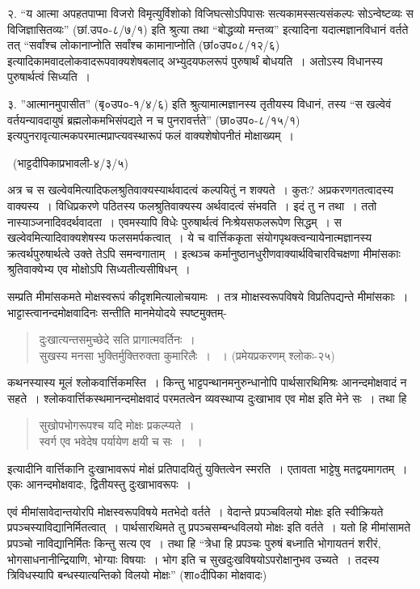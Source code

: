 {२. “य आत्मा अपहतपाप्मा विजरो विमृत्युर्विशोको विजिघत्सोऽपिपासः सत्यकामस्सत्यसंकल्पः सोऽन्वेष्टव्यः स विजिज्ञासितव्यः” (छां.उप०-८/७/१) इति श्रुत्या तथा “बोद्धव्यो मन्तव्य” इत्यादिना यदात्मज्ञानविधानं वर्तते तत् “सर्वांश्च लोकानाप्नोति सर्वांश्च कामानाप्नोति (छां०उप०८/१२/६) इत्यादिकामवादलोकवादरूपवाक्यशेषबलाद् अभ्युदयफलरूपं पुरुषार्थं बोधयति~। अतोऽस्य विधानस्य पुरुषार्थत्वं सिध्यति~। 

३. ”आत्मानमुपासीत” (बृ०उप०-१/४/६) इति श्रुत्यामात्मज्ञानस्य तृतीयस्य विधानं, तस्य “स खल्वेवं वर्तयन्यावदायुषं ब्रह्मलोकमभिसंपद्यते न च पुनरावर्त्तते” (छा०उप०-८/१५/१) इत्यपुनरावृत्यात्मकपरमात्मप्राप्त्यवस्थारूपं फलं वाक्यशेषोपनीतं मोक्षाख्यम्~। 

~\hfill (भाट्टदीपिकाप्रभावली-४/३/५) 

अत्र च स खल्वेवमित्यादिफलश्रुतिवाक्यस्यार्थवादत्वं कल्पयितुं न शक्यते~। कुतः? अप्रकरणगतत्वादस्य वाक्यस्य~। विधिप्रकरणे पठितस्य फलश्रुतिवाक्यस्य अर्थवादत्वं संभवति~। इदं तु न तथा~। ततो नास्याञ्जनादिवदर्थवादता~। एवमस्यापि विधेः पुरुषार्थत्वं निःश्रेयसफलरूपेण सिद्धम्~। स खल्वेवमित्यादिवाक्यशेषस्य फलसमर्पकत्वात्~। ये च वार्त्तिककृता संयोगपृथक्त्वन्यायेनात्मज्ञानस्य क्रत्वर्थपुरुषार्थत्वे उक्ते तेऽपि समन्वगाताम्~। इत्थञ्च कर्मानुष्ठानधुरीणवाक्यार्थविचारविचक्षणा मीमांसकाः श्रुतिवाक्येभ्य एव मोक्षोऽपि सिध्यतीत्यसीषिधन्~। 

सम्प्रति मीमांसकमते मोक्षस्वरूपं कीदृशमित्यालोचयामः~। तत्र मोाक्षस्वरूपविषये विप्रतिपद्यन्ते मीमांसकाः~। भाट्टास्त्वानन्दमोक्षवादिनः सन्तीति मानमेयोदये स्पष्टमुक्तम्-
\begin{verse}
दुःखात्यन्तसमुच्छेदे सति प्रागात्मवर्तिनः~। \\
सुखस्य मनसा भुक्तिर्मुक्तिरुक्ता कुमारिलैः~। ~। (प्रमेयप्रकरणम् श्लोकः-२५)
\end{verse}
कथनस्यास्य मूलं श्लोकवार्त्तिकमस्ति~। किन्तु भाट्टपन्थानमनुरुन्धानोपि पार्थसारथिमिश्रः आनन्दमोक्षवादं न सहते~। श्लोकवार्त्तिकस्थमानन्दमोक्षवादं परमतत्वेन व्यवस्थाप्य दुःखाभाव एव मोक्ष इति मेने सः~। तथा हि
\begin{verse}
सुखोपभोगरूपश्च यदि मोक्षः प्रकल्प्यते~। \\
स्वर्ग एव भवेदेष पर्यायेण क्षयी च सः~। ~। 
\end{verse}
इत्यादीनि वार्त्तिकानि दुःखाभावरूपं मोक्षं प्रतिपादयितुं युक्तित्वेन स्मरति~। एतावता भाट्टेषु मतद्वयमागतम्~। एकः आनन्दमोक्षवादः, द्वितीयस्तु दुःखाभावरूपः~। 

एवं मीमांसावेदान्तयोरपि मोक्षस्वरूपविषये मतभेदो वर्तते~। वेदान्ते प्रपञ्चविलयो मोक्षः इति स्वीक्रियते प्रपञ्चस्याविद्यानिर्मितत्वात्~। पार्थसारथिमते तु प्रपञ्चसम्बन्धविलयो मोक्षः इति वर्तते~। यतो हि मीमांसामते प्रपञ्चो नाविद्यानिर्मितः किन्तु सत्य एव~। तथा हि  “त्रेधा हि प्रपञ्चः पुरुषं बध्नाति भोगायतनं  शरीरं, भोगसाधनानीन्द्रियाणि, भोग्याः विषयाः~। भोग इति च सुखदुःखविषयोऽपरोक्षानुभव उच्यते~। तदस्य त्रिविधस्यापि बन्धस्यात्यन्तिको विलयो मोक्षः” (शा०दीपिका मोक्षवादः)

}

